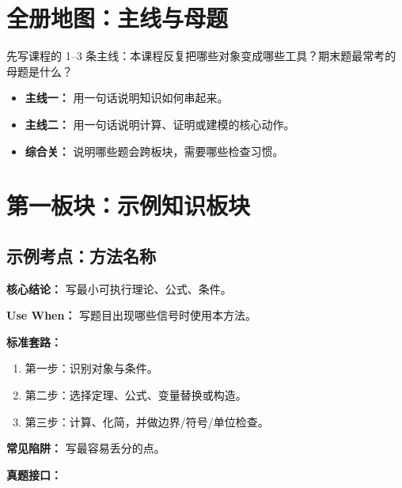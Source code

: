 \section*{全册地图：主线与母题}

先写课程的 1--3 条主线：本课程反复把哪些对象变成哪些工具？期末题最常考的母题是什么？

\begin{itemize}
  \item \textbf{主线一：} 用一句话说明知识如何串起来。
  \item \textbf{主线二：} 用一句话说明计算、证明或建模的核心动作。
  \item \textbf{综合关：} 说明哪些题会跨板块，需要哪些检查习惯。
\end{itemize}

\section{第一板块：示例知识板块}

\subsection{示例考点：方法名称}

\textbf{核心结论：} 写最小可执行理论、公式、条件。

\textbf{Use When：} 写题目出现哪些信号时使用本方法。

\textbf{标准套路：}
\begin{enumerate}
  \item 第一步：识别对象与条件。
  \item 第二步：选择定理、公式、变量替换或构造。
  \item 第三步：计算、化简，并做边界/符号/单位检查。
\end{enumerate}

\textbf{常见陷阱：} 写最容易丢分的点。

\textbf{真题接口：} 
